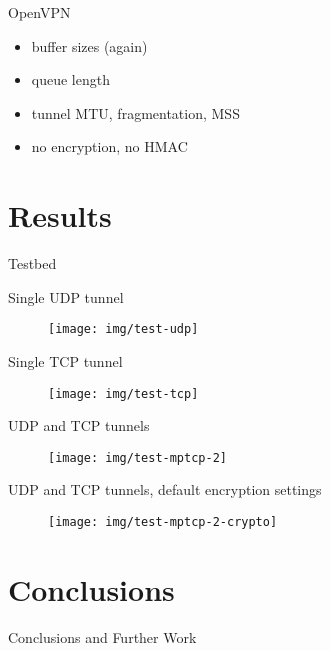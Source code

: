 \documentclass{beamer}
\begin{document}
\begin{frame}{OpenVPN}
  \begin{itemize}
    \item buffer sizes (again)
    \item queue length
    \item tunnel MTU, fragmentation, MSS
    \item no encryption, no HMAC
  \end{itemize}
\end{frame}

\section{Results}
\begin{frame}{Testbed}
\end{frame}

\begin{frame}{Single UDP tunnel}
  \begin{figure}
    \texttt{[image: img/test-udp]}
  \end{figure}
\end{frame}

\begin{frame}{Single TCP tunnel}
  \begin{figure}
    \texttt{[image: img/test-tcp]}
  \end{figure}
\end{frame}

\begin{frame}{UDP and TCP tunnels}
  \begin{figure}
    \texttt{[image: img/test-mptcp-2]}
  \end{figure}
\end{frame}

\begin{frame}{UDP and TCP tunnels, default encryption settings}
  \begin{figure}
    \texttt{[image: img/test-mptcp-2-crypto]}
  \end{figure}

\end{frame}

\section{Conclusions}
\begin{frame}{Conclusions and Further Work}
\end{frame}
\end{document}
